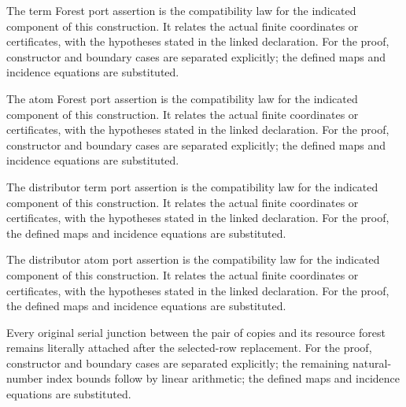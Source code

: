 The term Forest port assertion is the compatibility law for the indicated component of this construction. It relates the actual finite coordinates or certificates, with the hypotheses stated in the linked declaration.
For the proof, constructor and boundary cases are separated explicitly; the defined maps and incidence equations are substituted.
\par{}

The atom Forest port assertion is the compatibility law for the indicated component of this construction. It relates the actual finite coordinates or certificates, with the hypotheses stated in the linked declaration.
For the proof, constructor and boundary cases are separated explicitly; the defined maps and incidence equations are substituted.
\par{}

The distributor term port assertion is the compatibility law for the indicated component of this construction. It relates the actual finite coordinates or certificates, with the hypotheses stated in the linked declaration.
For the proof, the defined maps and incidence equations are substituted.
\par{}

The distributor atom port assertion is the compatibility law for the indicated component of this construction. It relates the actual finite coordinates or certificates, with the hypotheses stated in the linked declaration.
For the proof, the defined maps and incidence equations are substituted.
\par{}

Every original serial junction between the pair of copies and its resource forest remains literally attached after the selected-row replacement.
For the proof, constructor and boundary cases are separated explicitly; the remaining natural-number index bounds follow by linear arithmetic; the defined maps and incidence equations are substituted.
\par{}

